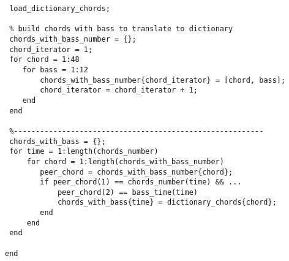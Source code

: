 \begin{apendicesenv}
\begin{lstlisting}
 load_dictionary_chords;

 % build chords with bass to translate to dictionary
 chords_with_bass_number = {};
 chord_iterator = 1;
 for chord = 1:48
    for bass = 1:12
        chords_with_bass_number{chord_iterator} = [chord, bass];
        chord_iterator = chord_iterator + 1;
    end
 end

 %---------------------------------------------------------
 chords_with_bass = {};
 for time = 1:length(chords_number)
     for chord = 1:length(chords_with_bass_number)
        peer_chord = chords_with_bass_number{chord};
        if peer_chord(1) == chords_number(time) && ... 
            peer_chord(2) == bass_time(time)
            chords_with_bass{time} = dictionary_chords{chord};
        end
     end
 end

end
\end{lstlisting}


\end{apendicesenv}


